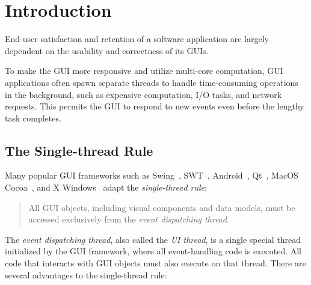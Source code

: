 \section{Introduction}
\label{sec:introduction}

End-user satisfaction and retention of a software application
 are largely dependent on the usability and correctness of
its GUIs.

To make the GUI more responsive and utilize multi-core computation,
GUI applications often spawn separate threads to handle time-consuming
operations in the background, such as expensive computation, I/O tasks,
and network requests. This permits the GUI to respond to new events
even before the lengthy task completes.



\subsection{The Single-thread Rule}

Many popular GUI frameworks such as Swing~\cite{swing},
SWT~\cite{swt}, Android~\cite{android},
Qt~\cite{qt}, MacOS Cocoa~\cite{macos},
and X Windows~\cite{xwindow}
adapt the \textit{single-thread rule}:

\vspace{-2mm}

\begin{quote}
All GUI objects, including visual components and data models, must be
 accessed exclusively from the \textit{event dispatching thread}.
\end{quote}

\vspace{-2mm}

The \textit{event dispatching thread}, also called the \textit{UI thread}, is a single
special thread initialized by the GUI framework, where all event-handling code
is executed. All code that interacts with GUI objects must also
execute on that thread.  There are several advantages to the single-thread rule:

